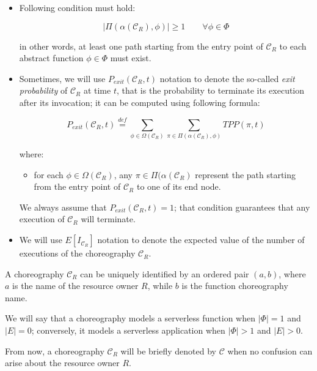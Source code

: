 \documentclass[12pt,a4paper]{report}
\newcommand{\mathDef}{\overset{\textit{def}}{=}}
\begin{document}
\begin{itemize}
	\item Following condition must hold:
	
	\begin{equation}\label{cond3}
		|\Pi(\alpha(\mathcal{C}_R), \phi)| \geq 1 \qquad \forall \phi \in \Phi
	\end{equation}

	in other words, at least one path starting from the entry point of $\mathcal{C}_R$ to each abstract function $\phi \in \Phi$ must  exist. 
	
	\item Sometimes, we will use $P_{exit}(\mathcal{C}_R,t)$ notation to denote the so-called \textit{exit probability} of $\mathcal{C}_R$ at time $t$, that is the probability to terminate its execution after its invocation; it can be computed using following formula:
	
	\begin{equation}
		P_{exit}(\mathcal{C}_R,t) \mathDef \sum_{\phi \in \Omega(\mathcal{C}_R)} \sum_{\pi \in \Pi(\alpha(\mathcal{C}_R), \phi)} TPP(\pi,t)
	\end{equation}
	
	where:
	
	\begin{itemize}
		\item for each $\phi \in \Omega(\mathcal{C}_R)$, any $\pi \in \Pi(\alpha(\mathcal{C}_R)$ represent the path starting from the entry point of $\mathcal{C}_R$ to one of its end node.
	\end{itemize}
	
	We always assume that $P_{exit}(\mathcal{C}_R,t) = 1$; that condition guarantees that any execution of $\mathcal{C}_R$ will terminate. 
	
	\item We will use $E[I_{\mathcal{C}_R}]$ notation to denote the expected value of the number of executions of the choreography $\mathcal{C}_R$.
	
\end{itemize} 

A choreography $\mathcal{C}_R$ can be uniquely identified by an ordered pair $(a, b)$, where $a$ is the name of the resource owner $R$, while $b$ is the function choreography name. 

We will say that a choreography models a serverless function when $|\Phi| = 1$ and $|E| = 0$; conversely, it models a serverless application when $|\Phi| > 1$ and $|E| > 0$.

From now, a choreography $\mathcal{C}_R$ will be briefly denoted by $\mathcal{C}$ when no confusion can arise about the resource owner $R$.
\end{document}
